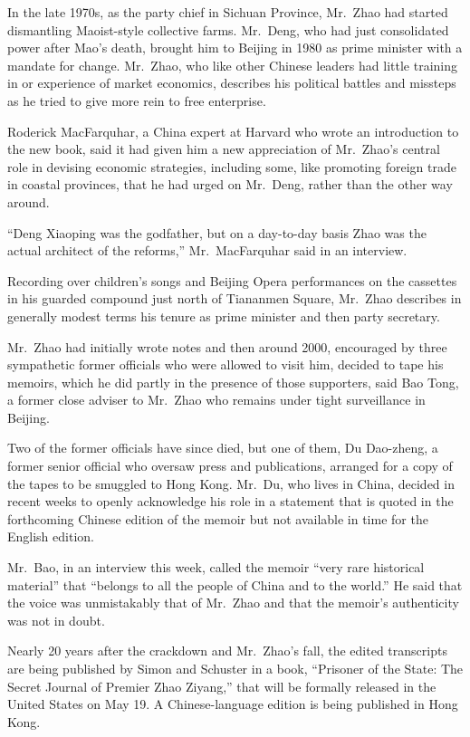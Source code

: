 \documentclass[12pt,a4paper,onecolumn]{article}
\begin{document}
In the late 1970s, as the party chief in Sichuan Province, Mr.~Zhao had started dismantling
Maoist-style collective farms. Mr.~Deng, who had just consolidated power after Mao's death, brought
him to Beijing in 1980 as prime minister with a mandate for change. Mr.~Zhao, who like other Chinese
leaders had little training in or experience of market economics, describes his political battles
and missteps as he tried to give more rein to free enterprise.

Roderick MacFarquhar, a China expert at Harvard who wrote an introduction to the new book, said it
had given him a new appreciation of Mr.~Zhao's central role in devising economic strategies,
including some, like promoting foreign trade in coastal provinces, that he had urged on Mr.~Deng,
rather than the other way around.

``Deng Xiaoping was the godfather, but on a day-to-day basis Zhao was the actual architect of the
reforms,'' Mr.~MacFarquhar said in an interview.

Recording over children's songs and Beijing Opera performances on the cassettes in his guarded
compound just north of Tiananmen Square, Mr.~Zhao describes in generally modest terms his tenure as
prime minister and then party secretary.

Mr.~Zhao had initially wrote notes and then around 2000, encouraged by three sympathetic former
officials who were allowed to visit him, decided to tape his memoirs, which he did partly in the
presence of those supporters, said Bao Tong, a former close adviser to Mr.~Zhao who remains under
tight surveillance in Beijing.

Two of the former officials have since died, but one of them, Du Dao-zheng, a former senior official
who oversaw press and publications, arranged for a copy of the tapes to be smuggled to Hong Kong.
Mr.~Du, who lives in China, decided in recent weeks to openly acknowledge his role in a statement
that is quoted in the forthcoming Chinese edition of the memoir but not available in time for the
English edition.

Mr.~Bao, in an interview this week, called the memoir ``very rare historical material'' that
``belongs to all the people of China and to the world.'' He said that the voice was unmistakably
that of Mr.~Zhao and that the memoir's authenticity was not in doubt.

Nearly 20 years after the crackdown and Mr.~Zhao's fall, the edited transcripts are being published
by Simon and Schuster in a book, ``Prisoner of the State: The Secret Journal of Premier Zhao
Ziyang,'' that will be formally released in the United States on May 19. A Chinese-language edition
is being published in Hong Kong.
\end{document}
